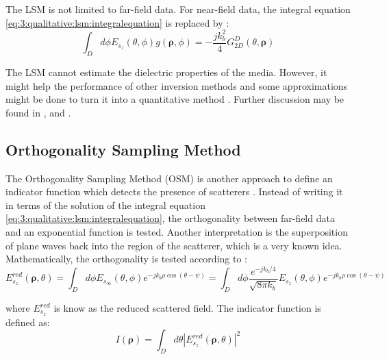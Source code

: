 			The LSM is not limited to far-field data. For near-field data, the integral equation \eqref{eq:3:qualitative:lsm:integralequation} is replaced by \citep{cakoni2016qualitative}:
			\begin{equation}
				\int_D d\phi E_{s_z}(\theta, \phi) g(\boldsymbol{\rho}, \phi) = - \frac{jk_b^2}{4} G^D_{2D}(\theta,\boldsymbol{\rho}) \label{eq:3:qualitative:lsm:nearfield}
			\end{equation}
		
			The LSM cannot estimate the dielectric properties of the media. However, it might help the performance of other inversion methods \citep{catapano2007simple,bao2007inverse} and some approximations might be done to turn it into a quantitative method \citep{crocco2012linear}. Further discussion may be found in \citep[see][chap. 5]{chen2017}, \citep{cakoni2016qualitative} and \citep[see][chap. 5]{pastorino2010}.
		
		\subsection{Orthogonality Sampling Method}\label{chap:methods:qualitative:osm}
		
			The Orthogonality Sampling Method (OSM) is another approach to define an indicator function which detects the presence of scatterers \citep{potthast2010study}. Instead of writing it in terms of the solution of the integral equation \eqref{eq:3:qualitative:lsm:integralequation}, the orthogonality between far-field data and an exponential function is tested. Another interpretation is the superposition of plane waves back into the region of the scatterer, which is a very known idea. Mathematically, the orthogonality is tested according to \citep{potthast2010study,akinci2016nearfield}:
			\begin{equation}
				E_{s_z}^{red} (\boldsymbol{\rho}, \theta) = \int_D d\phi E_{s_\infty}(\theta,\phi)e^{-jk_b\rho\cos(\theta-\psi)} = \int_D d\phi \frac{e^{-jk_b/4}}{\sqrt{8\pi k_b}} E_{s_z}(\theta, \phi) e^{-jk_b\rho\cos(\theta-\psi)} \label{eq:3:qualitative:osm:farfield:equation}
			\end{equation}
		
			\noindent where $E_{s_z}^{red}$ is know as the reduced scattered field. The indicator function is defined as:
			\begin{equation}
				I(\boldsymbol{\rho}) = \int_D d\theta |E_{s_z}^{red} (\boldsymbol{\rho}, \theta)|^2 \label{eq:3:qualitative:osm:farfield:indicator}
			\end{equation}
		

